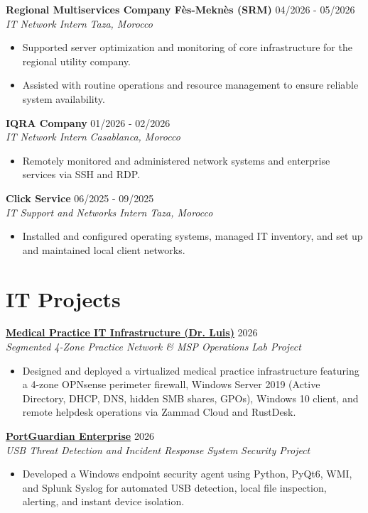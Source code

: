 \documentclass[10pt,a4paper]{article}
\newcommand{\cvheading}[4]{
  \textbf{#1} \hfill #2 \\[0.08em]
  \textit{#3} \hfill \textit{#4}
}
\newcommand{\cvheadinglink}[5]{
  \textbf{\href{#5}{#1}} \hfill #2 \\[0.08em]
  \textit{#3} \hfill \textit{#4}
}
\begin{document}
\cvheading{Regional Multiservices Company Fès-Meknès (SRM)}{04/2026 - 05/2026}{IT Network Intern}{Taza, Morocco}
\begin{itemize}
  \item Supported server optimization and monitoring of core infrastructure for the regional utility company.
  \item Assisted with routine operations and resource management to ensure reliable system availability.
\end{itemize}

\cvheading{IQRA Company}{01/2026 - 02/2026}{IT Network Intern}{Casablanca, Morocco}
\begin{itemize}
  \item Remotely monitored and administered network systems and enterprise services via SSH and RDP.
\end{itemize}

\cvheading{Click Service}{06/2025 - 09/2025}{IT Support and Networks Intern}{Taza, Morocco}
\begin{itemize}
  \item Installed and configured operating systems, managed IT inventory, and set up and maintained local client networks.
\end{itemize}

\section*{IT Projects}
\cvheadinglink{Medical Practice IT Infrastructure (Dr. Luis)}{2026}{Segmented 4-Zone Practice Network \& MSP Operations}{Lab Project}{https://grydsh.dev/dental-clinic.html}
\begin{itemize}
  \item Designed and deployed a virtualized medical practice infrastructure featuring a 4-zone OPNsense perimeter firewall, Windows Server 2019 (Active Directory, DHCP, DNS, hidden SMB shares, GPOs), Windows 10 client, and remote helpdesk operations via Zammad Cloud and RustDesk.
\end{itemize}

\cvheadinglink{PortGuardian Enterprise}{2026}{USB Threat Detection and Incident Response System}{Security Project}{https://grydsh.dev/portguardian.html}
\begin{itemize}
  \item Developed a Windows endpoint security agent using Python, PyQt6, WMI, and Splunk Syslog for automated USB detection, local file inspection, alerting, and instant device isolation.
\end{itemize}
\end{document}
